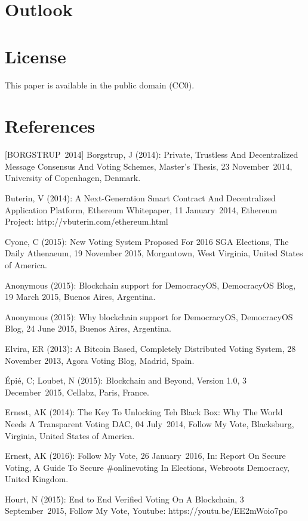 \documentclass[9pt,oneside]{amsart}
\begin{document}
\begin{multicols}{2}
\section{Outlook}

\section{License}
This paper is available in the public domain (CC0).

\section{References}
[BORGSTRUP~2014] Borgstrup, J (2014): Private, Trustless And Decentralized Message Consensus And Voting Schemes, Master's Thesis, 23 November~2014, University of Copenhagen, Denmark.\par
[BUTERIN~2014] Buterin, V (2014): A Next-Generation Smart Contract And Decentralized Application Platform, Ethereum Whitepaper, 11 January~2014, Ethereum Project: http://vbuterin.com/ethereum.html\par
[COYNE~2015] Cyone, C (2015): New Voting System Proposed For 2016 SGA Elections, The Daily Athenaeum, 19 November 2015, Morgantown, West Virginia, United States of America.\par
[DEMOCRACYOS~2015A] Anonymous (2015): Blockchain support for DemocracyOS, DemocracyOS Blog, 19 March 2015, Buenos Aires, Argentina.\par
[DEMOCRACYOS~2015B] Anonymous (2015): Why blockchain support for DemocracyOS, DemocracyOS Blog, 24 June 2015, Buenos Aires, Argentina.\par
[ELVIRA~2013] Elvira, ER (2013): A Bitcoin Based, Completely Distributed Voting System, 28 November 2013, Agora Voting Blog, Madrid, Spain.\par
[ÉPIÉ~et~al.~2015] Épié, C; Loubet, N (2015): Blockchain and Beyond, Version 1.0, 3 December~2015, Cellabz, Paris, France.\par
[ERNEST~2014] Ernest, AK (2014): The Key To Unlocking Teh Black Box: Why The World Needs A Transparent Voting DAC, 04 July~2014, Follow My Vote, Blacksburg, Virginia, United States of America.\par
[ERNEST~2016] Ernest, AK (2016): Follow My Vote, 26 January~2016, In: Report On Secure Voting, A Guide To Secure \#onlinevoting In Elections, Webroots Democracy, United Kingdom.\par
[HOURT~2015A] Hourt, N (2015): End to End Verified Voting On A Blockchain, 3 September~2015, Follow My Vote, Youtube: https://youtu.be/EE2mWoio7po\par

\end{multicols}
\end{document}
